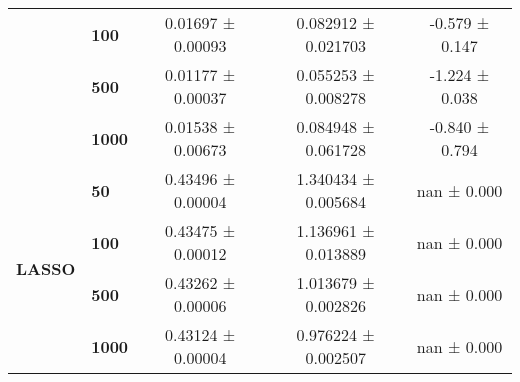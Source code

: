 \begin{tabular}{llccc}
      & \textbf{100 } &  0.01697 ± 0.00093 &  0.082912 ± 0.021703 &  -0.579 ± 0.147 \\
      & \textbf{500 } &  0.01177 ± 0.00037 &  0.055253 ± 0.008278 &  -1.224 ± 0.038 \\
      & \textbf{1000} &  0.01538 ± 0.00673 &  0.084948 ± 0.061728 &  -0.840 ± 0.794 \\
\cline{1-5}
\multirow{4}{*}{\textbf{LASSO}} & \textbf{50  } &  0.43496 ± 0.00004 &  1.340434 ± 0.005684 &     nan ± 0.000 \\
      & \textbf{100 } &  0.43475 ± 0.00012 &  1.136961 ± 0.013889 &     nan ± 0.000 \\
      & \textbf{500 } &  0.43262 ± 0.00006 &  1.013679 ± 0.002826 &     nan ± 0.000 \\
      & \textbf{1000} &  0.43124 ± 0.00004 &  0.976224 ± 0.002507 &     nan ± 0.000 \\
\bottomrule
\end{tabular}
